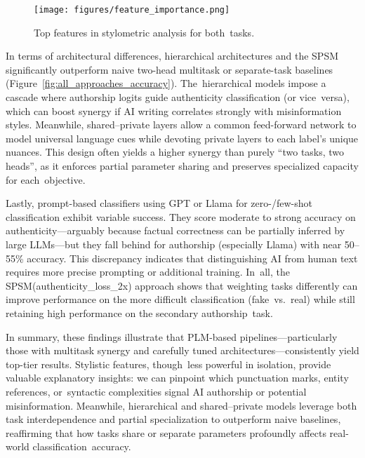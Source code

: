 \documentclass[electronics,article,accept,pdftex,moreauthors,electronics]{Definitions/mdpi}
\begin{document}
\begin{figure}[H]
    \texttt{[image: figures/feature\_importance.png]}\vspace{-4pt}
    \caption{Top features in stylometric analysis for both~tasks.}
    \label{fig:stylo_importances}
\end{figure}




In terms of architectural differences, hierarchical architectures and the SPSM significantly outperform naive two-head multitask or separate-task baselines (Figure~\ref{fig:all_approaches_accuracy}). The~hierarchical models impose a cascade where authorship logits guide authenticity classification (or vice~versa), which can boost synergy if AI writing correlates strongly with misinformation styles. Meanwhile, shared--private layers allow a common feed-forward network to model universal language cues while devoting private layers to each label’s unique nuances. This design often yields a higher synergy than purely “two tasks, two heads”, as it enforces partial parameter sharing and preserves specialized capacity for each~objective.

Lastly, prompt-based classifiers using GPT or Llama for zero-/few-shot classification exhibit variable success. They score moderate to strong accuracy on authenticity---arguably because factual correctness can be partially inferred by large LLMs---but they fall behind for authorship (especially Llama) with near 50--55\% accuracy. This discrepancy indicates that distinguishing AI from human text requires more precise prompting or additional training. In~all, the SPSM(authenticity\_loss\_2x) approach shows that weighting tasks differently can improve performance on the more difficult classification (fake~vs.~real) while still retaining high performance on the secondary authorship~task.

In summary, these findings illustrate that PLM-based pipelines---particularly those with multitask synergy and carefully tuned architectures---consistently yield top-tier results. Stylistic features, though~less powerful in isolation, provide valuable explanatory insights: we can pinpoint which punctuation marks, entity references, or~syntactic complexities signal AI authorship or potential misinformation. Meanwhile, hierarchical and shared--private models leverage both task interdependence and partial specialization to outperform naive baselines, reaffirming that how tasks share or separate parameters profoundly affects real-world classification~accuracy.
\end{document}
